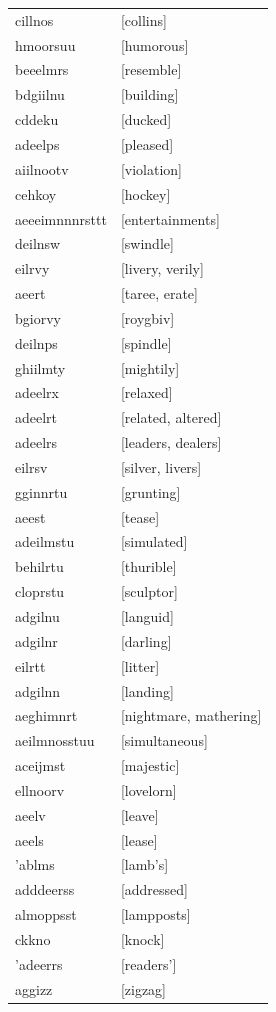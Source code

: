 \documentclass{article}
\begin{document}
\begin{tabular}{ll}
cillnos & [collins] \\
hmoorsuu & [humorous] \\
beeelmrs & [resemble] \\
bdgiilnu & [building] \\
cddeku & [ducked] \\
adeelps & [pleased] \\
aiilnootv & [violation] \\
cehkoy & [hockey] \\
aeeeimnnnrsttt & [entertainments] \\
deilnsw & [swindle] \\
eilrvy & [livery, verily] \\
aeert & [taree, erate] \\
bgiorvy & [roygbiv] \\
deilnps & [spindle] \\
ghiilmty & [mightily] \\
adeelrx & [relaxed] \\
adeelrt & [related, altered] \\
adeelrs & [leaders, dealers] \\
eilrsv & [silver, livers] \\
gginnrtu & [grunting] \\
aeest & [tease] \\
adeilmstu & [simulated] \\
behilrtu & [thurible] \\
cloprstu & [sculptor] \\
adgilnu & [languid] \\
adgilnr & [darling] \\
eilrtt & [litter] \\
adgilnn & [landing] \\
aeghimnrt & [nightmare, mathering] \\
aeilmnosstuu & [simultaneous] \\
aceijmst & [majestic] \\
ellnoorv & [lovelorn] \\
aeelv & [leave] \\
aeels & [lease] \\
'ablms & [lamb's] \\
adddeerss & [addressed] \\
almoppsst & [lampposts] \\
ckkno & [knock] \\
'adeerrs & [readers'] \\
aggizz & [zigzag] \\

\end{tabular}
\end{document}
